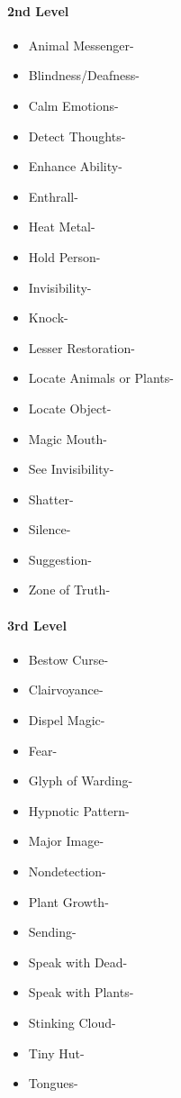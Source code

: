 \documentclass[
]{article}
\providecommand{\tightlist}{%
  \setlength{\itemsep}{0pt}\setlength{\parskip}{0pt}}
\begin{document}
\hypertarget{2nd-level}{%
\paragraph{2nd Level}\label{2nd-level}}

\begin{itemize}
\tightlist
\item
  Animal Messenger-
\item
  Blindness/Deafness-
\item
  Calm Emotions-
\item
  Detect Thoughts-
\item
  Enhance Ability-
\item
  Enthrall-
\item
  Heat Metal-
\item
  Hold Person-
\item
  Invisibility-
\item
  Knock-
\item
  Lesser Restoration-
\item
  Locate Animals or Plants-
\item
  Locate Object-
\item
  Magic Mouth-
\item
  See Invisibility-
\item
  Shatter-
\item
  Silence-
\item
  Suggestion-
\item
  Zone of Truth-
\end{itemize}

\hypertarget{3rd-level}{%
\paragraph{3rd Level}\label{3rd-level}}

\begin{itemize}
\tightlist
\item
  Bestow Curse-
\item
  Clairvoyance-
\item
  Dispel Magic-
\item
  Fear-
\item
  Glyph of Warding-
\item
  Hypnotic Pattern-
\item
  Major Image-
\item
  Nondetection-
\item
  Plant Growth-
\item
  Sending-
\item
  Speak with Dead-
\item
  Speak with Plants-
\item
  Stinking Cloud-
\item
  Tiny Hut-
\item
  Tongues-
\end{itemize}
\end{document}
